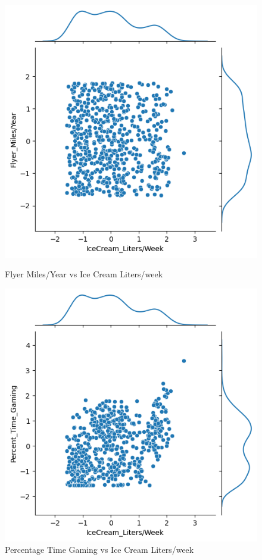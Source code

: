 \documentclass{article}
\begin{document}
    \begin{figure}[H]
        \centering
        \begin{minipage}[t]{0.47\textwidth}
            \centering
            \includegraphics[width=\textwidth, height=0.3\textheight]{pre_c.png}
            \caption{\small{Flyer Miles/Year vs Ice Cream Liters/week}}
        \end{minipage}
        \hfill
        \begin{minipage}[t]{0.47\textwidth}
            \centering
            \includegraphics[width=\textwidth, height=0.3\textheight]{pre_b.png}
            \caption{\small{Percentage Time Gaming vs Ice Cream Liters/week}}
        \end{minipage}
    \end{figure}
\end{document}

